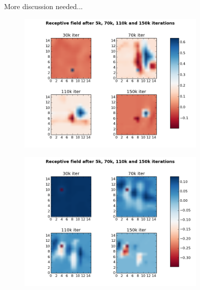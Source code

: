 More discussion needed...

\begin{figure}[H]
 \centering
 \includegraphics[width = 0.8\textwidth]{../results/exercise3b}
 \caption{}
 \label{fig:bild3}
\end{figure}

\begin{figure}[H]
 \centering
 \includegraphics[width = 0.8\textwidth]{../results/exercise3c}
 \caption{}
 \label{fig:bild4}
\end{figure}


